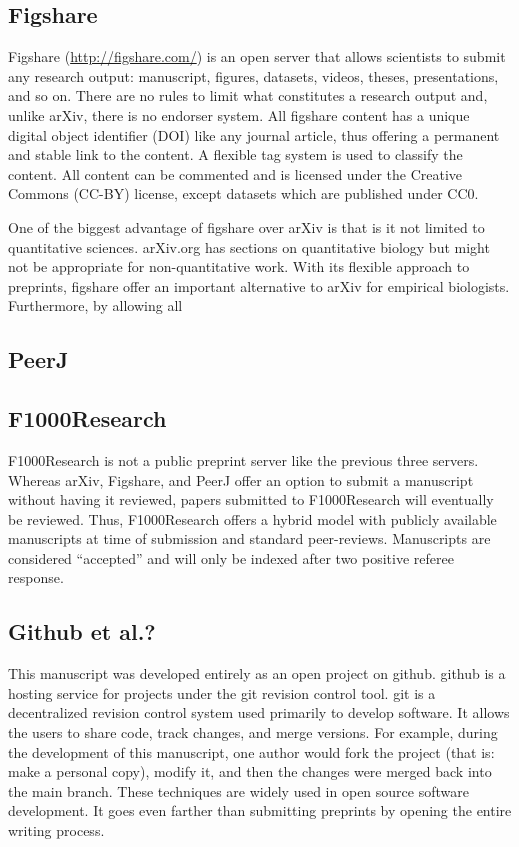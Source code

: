 \documentclass[letterpaper,twocolumn,superscriptaddress,showkeys]{revtex4-1}
\begin{document}
\subsection{Figshare}

Figshare (\href{http://figshare.com/}{http://figshare.com/}) is an open server
that allows scientists to submit any research output: manuscript, figures,
datasets, videos, theses, presentations, and so on. There are no rules to limit
what constitutes a research output and, unlike arXiv, there is no endorser
system. All figshare content has a unique digital object identifier (DOI) like
any journal article, thus offering a permanent and stable link to the content.
A flexible tag system is used to classify the content. All content can
be commented and is licensed under the Creative Commons (CC-BY) license, except
datasets which are published under CC0.

One of the biggest advantage of figshare over arXiv is that is it not limited to
quantitative sciences. arXiv.org has sections on quantitative biology but might
not be appropriate for non-quantitative work. With its flexible approach to
preprints, figshare offer an important alternative to arXiv for empirical
biologists. Furthermore, by allowing all 

\subsection{PeerJ}


\subsection{F1000Research}

F1000Research is not a public preprint server like the previous three servers.
Whereas arXiv, Figshare, and PeerJ offer an option to submit a manuscript
without having it reviewed, papers submitted to F1000Research will eventually be
reviewed. Thus, F1000Research offers a hybrid model with publicly available
manuscripts at time of submission and standard peer-reviews. Manuscripts are
considered ``accepted'' and will only be indexed after two positive referee
response.

\subsection{Github et al.?}

This manuscript was developed entirely as an open project on github. github is a
hosting service for projects under the git revision control tool. git is a
decentralized revision control system used primarily to develop software. It
allows the users to share code, track changes, and merge versions. For example,
during the development of this manuscript, one author would fork the project
(that is: make a personal copy), modify it, and then the changes were merged
back into the main branch. These techniques are widely used in open source
software development. It goes even farther than submitting preprints by opening
the entire writing process. 
\end{document}

